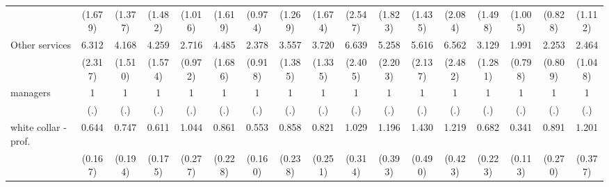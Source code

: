 {\begin{tabular}{l*{16}{c}}
                    &     (1.679)         &     (1.377)         &     (1.482)         &     (1.016)         &     (1.619)         &     (0.974)         &     (1.269)         &     (1.674)         &     (2.547)         &     (1.823)         &     (1.435)         &     (2.084)         &     (1.498)         &     (1.005)         &     (0.828)         &     (1.112)         \\
[1em]
Other services      &       6.312\sym{***}&       4.168\sym{***}&       4.259\sym{***}&       2.716\sym{**} &       4.485\sym{***}&       2.378\sym{*}  &       3.557\sym{**} &       3.720\sym{***}&       6.639\sym{***}&       5.258\sym{***}&       5.616\sym{***}&       6.562\sym{***}&       3.129\sym{**} &       1.991         &       2.253\sym{*}  &       2.464\sym{*}  \\
                    &     (2.317)         &     (1.510)         &     (1.574)         &     (0.972)         &     (1.686)         &     (0.918)         &     (1.385)         &     (1.335)         &     (2.405)         &     (2.203)         &     (2.137)         &     (2.482)         &     (1.281)         &     (0.798)         &     (0.809)         &     (1.048)         \\
[1em]
managers            &           1         &           1         &           1         &           1         &           1         &           1         &           1         &           1         &           1         &           1         &           1         &           1         &           1         &           1         &           1         &           1         \\
                    &         (.)         &         (.)         &         (.)         &         (.)         &         (.)         &         (.)         &         (.)         &         (.)         &         (.)         &         (.)         &         (.)         &         (.)         &         (.)         &         (.)         &         (.)         &         (.)         \\
[1em]
white collar - prof.&       0.644         &       0.747         &       0.611         &       1.044         &       0.861         &       0.553\sym{*}  &       0.858         &       0.821         &       1.029         &       1.196         &       1.430         &       1.219         &       0.682         &       0.341\sym{**} &       0.891         &       1.201         \\
                    &     (0.167)         &     (0.194)         &     (0.175)         &     (0.277)         &     (0.228)         &     (0.160)         &     (0.238)         &     (0.251)         &     (0.314)         &     (0.393)         &     (0.490)         &     (0.423)         &     (0.223)         &     (0.113)         &     (0.270)         &     (0.377)         \\

\end{tabular}}
